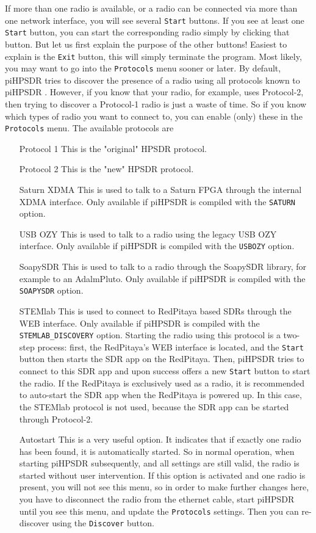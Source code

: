 \documentclass[12pt]{book}
\def\rett#1{\texttt{\color{red}#1}}
\def\pH{pi\-HPSDR }
\begin{document}
If more than one radio is available, or a radio can be connected via more than one network interface,
you will see several \rett{Start} buttons.
If you see at least one \rett{Start} button, you can start the corresponding radio simply
by clicking that button. But let us first explain the
purpose of the other buttons! Easiest to explain is the \rett{Exit} button, this will simply terminate
the program. Most likely, you may want to go into the \rett{Protocols} menu sooner or later.
By default, \pH tries to discover the presence of a radio using all protocols known to \pH. However,
if you know that your radio, for example, uses Protocol-2, then trying to discover a Protocol-1
radio is just a waste of time. So if you know which types of radio you want to connect to, you can enable
(only) these in the \rett{Protocols} menu. The available protocols are

\begin{itemize}[font=\texttt, left=80pt]
\item[Protocol 1]{This is the "original" HPSDR protocol.}
\item[Protocol 2]{This is the "new" HPSDR protocol.}
\item[Saturn XDMA]{This is used to talk to a Saturn FPGA through the internal XDMA interface. Only available
if \pH is compiled with the \texttt{SATURN}  option.}
\item[USB OZY]{This is used to talk to a radio using the legacy USB OZY interface. Only available if \pH
is compiled with the \texttt{USBOZY} option.}
\item[SoapySDR]{This is used to talk to a radio through the SoapySDR library, for example to an AdalmPluto.
Only available if \pH is compiled with the \texttt{SOAPYSDR} option.}
\item[STEMlab]{This is used to connect to RedPitaya based SDRs through the WEB interface. Only available if
\pH is compiled with the \texttt{STEMLAB\_DISCOVERY} option. Starting the radio using this protocol is a
two-step process:
first, the RedPitaya's WEB interface is located, and the \texttt{Start} button then starts the SDR app
on the RedPitaya. Then, \pH tries to connect to this SDR app and upon success offers a new
\texttt{Start} button to start the radio. If the RedPitaya is exclusively used as a radio, it is recommended
to auto-start the SDR app
when the RedPitaya is powered up. In this case, the STEMlab protocol is not used, because the SDR app can be started through Protocol-2.}
\item[Autostart]{This is a very useful option. It indicates that if exactly one radio has been found, it is
automatically started. So in normal operation, when starting \pH subsequently, and all settings are
still valid, the radio is started without user intervention. If this option is activated and one radio is
present, you will not see this menu, so in order to make further changes here, you have to disconnect the
radio from the ethernet cable, start \pH until you see this menu, and update the \rett{Protocols}
settings. Then you can re-discover using the \rett{Discover} button.}
\end{itemize}
\end{document}
